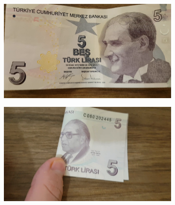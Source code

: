 \documentclass{article}
\begin{document}
\begin{figure}[h]
    \centering
    \begin{subfigure}[b]{0.45\textwidth}
        \centering
        \includegraphics[width=\textwidth]{5_1}
    \end{subfigure}
    \begin{subfigure}[b]{0.45\textwidth}
        \centering
        \includegraphics[width=\textwidth]{5_2}
    \end{subfigure}


\end{figure}
\end{document}
